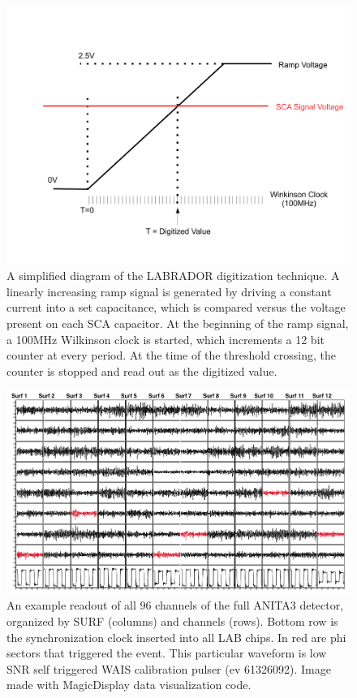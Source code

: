 \begin{figure}
\centering
	\includegraphics[width=\textwidth]{figures/LAB3_Dig}
	\caption{A simplified diagram of the LABRADOR digitization technique.  A linearly increasing ramp signal is generated by driving a constant current into a set capacitance, which is compared versus the voltage present on each SCA capacitor.  At the beginning of the ramp signal, a 100MHz Wilkinson clock is started, which increments a 12 bit counter at every period.  At the time of the threshold crossing, the counter is stopped and read out as the digitized value.}
	\label{fig:LAB_Dig}
\end{figure}

		
\begin{figure}
\centering
	\includegraphics[width=\textwidth]{figures/waveformSnapshot}
	\caption{An example readout of all 96 channels of the full ANITA3 detector, organized by SURF (columns) and channels (rows).  Bottom row is the synchronization clock inserted into all LAB chips.  In red are phi sectors that triggered the event.  This particular waveform is low SNR self triggered WAIS calibration pulser (ev 61326092).  Image made with MagicDisplay data visualization code.}
	\label{fig:waveformSnapshot}
\end{figure}
		
